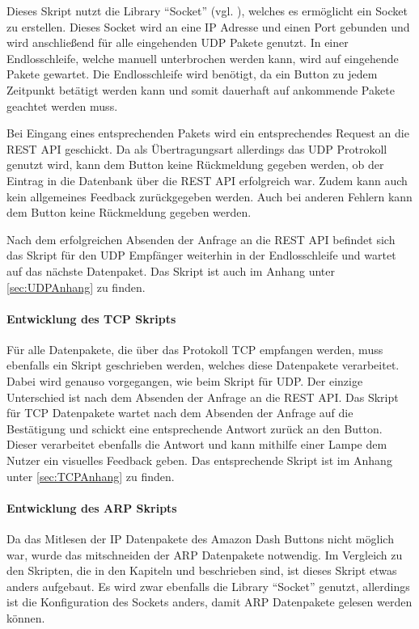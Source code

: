 Dieses Skript nutzt die Library ``Socket'' (vgl. \cite{.20.02.2017}), welches es ermöglicht ein Socket zu erstellen. Dieses Socket wird an eine \ac{IP} Adresse und einen Port gebunden und wird anschließend für alle eingehenden \ac{UDP} Pakete genutzt. In einer Endlosschleife, welche manuell unterbrochen werden kann, wird auf eingehende Pakete gewartet. Die Endlosschleife wird benötigt, da ein Button zu jedem Zeitpunkt betätigt werden kann und somit dauerhaft auf ankommende Pakete geachtet werden muss. 

Bei Eingang eines entsprechenden Pakets wird ein entsprechendes Request an die \ac{REST} \ac{API} geschickt. Da als Übertragungsart allerdings das UDP Protrokoll genutzt wird, kann dem Button keine Rückmeldung gegeben werden, ob der Eintrag in die Datenbank über die \ac{REST} \ac{API} erfolgreich war. Zudem kann auch kein allgemeines Feedback zurückgegeben werden. Auch bei anderen Fehlern kann dem Button keine Rückmeldung gegeben werden. 

Nach dem erfolgreichen Absenden der Anfrage an die \ac{REST} \ac{API} befindet sich das Skript für den \ac{UDP} Empfänger weiterhin in der Endlosschleife und wartet auf das nächste Datenpaket. 
Das Skript ist auch im Anhang unter \ref{sec:UDPAnhang} zu finden. 

\paragraph{Entwicklung des TCP Skripts}$\;$ \\  
\label{sec:Entwicklung des TCP Skripts-1} 
Für alle Datenpakete, die über das Protokoll \ac{TCP} empfangen werden, muss ebenfalls ein Skript geschrieben werden, welches diese Datenpakete verarbeitet. Dabei wird genauso vorgegangen, wie beim Skript für UDP. Der einzige Unterschied ist nach dem Absenden der Anfrage an die \ac{REST} \ac{API}. Das Skript für \ac{TCP} Datenpakete wartet nach dem Absenden der Anfrage auf die Bestätigung und schickt eine entsprechende Antwort zurück an den Button. Dieser verarbeitet ebenfalls die Antwort und kann mithilfe einer Lampe dem Nutzer ein visuelles Feedback geben. 
Das entsprechende Skript ist im Anhang unter \ref{sec:TCPAnhang} zu finden.

\paragraph{Entwicklung des ARP Skripts}$\;$ \\  
\label{sec:Entwicklung des ARP Skripts-1} 
Da das Mitlesen der \ac{IP} Datenpakete des Amazon Dash Buttons nicht möglich war, wurde das mitschneiden der \ac{ARP} Datenpakete notwendig. 
Im Vergleich zu den Skripten, die in den Kapiteln  und  beschrieben sind, ist dieses Skript etwas anders aufgebaut. Es wird zwar ebenfalls die Library ``Socket'' genutzt, allerdings ist die Konfiguration des Sockets anders, damit \ac{ARP} Datenpakete gelesen werden können. 


